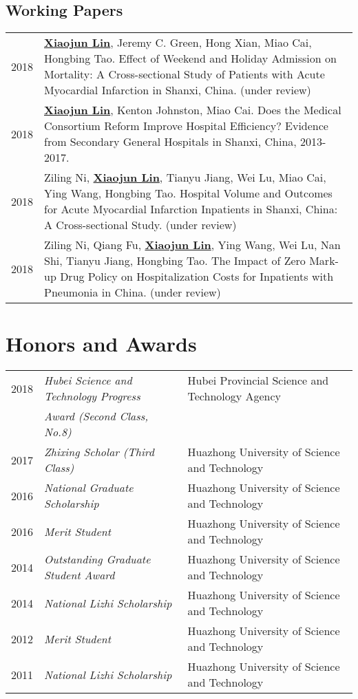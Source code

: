 \documentclass[a4paper,10pt]{article}
\begin{document}
\subsection*{Working Papers}
\begin{longtable}{r p{13cm}}
2018 & \underline{\textbf{Xiaojun Lin}}, Jeremy C. Green, Hong Xian, Miao Cai, Hongbing Tao. Effect of Weekend and Holiday Admission on Mortality: A Cross-sectional Study of Patients with Acute Myocardial Infarction in Shanxi, China. (under review)\\[5pt]

2018 & \underline{\textbf{Xiaojun Lin}}, Kenton Johnston, Miao Cai. Does the Medical Consortium Reform Improve Hospital Efficiency? Evidence from Secondary General Hospitals in Shanxi, China, 2013-2017.\\[5pt]

2018 & Ziling Ni, \underline{\textbf{Xiaojun Lin}}, Tianyu Jiang, Wei Lu, Miao Cai, Ying Wang, Hongbing Tao. Hospital Volume and Outcomes for Acute Myocardial Infarction Inpatients in Shanxi, China: A Cross-sectional Study. (under review)\\[5pt]

2018 & Ziling Ni, Qiang Fu, \underline{\textbf{Xiaojun Lin}}, Ying Wang, Wei Lu, Nan Shi, Tianyu Jiang, Hongbing Tao. The Impact of Zero Mark-up Drug Policy on Hospitalization Costs for Inpatients with Pneumonia in China. (under review)\\[5pt]
\end{longtable}


\section{Honors and Awards}
\begin{tabular}{rll}
2018 &  \textit{Hubei Science and Technology Progress} & Hubei Provincial Science and Technology Agency\\
& \textit{Award (Second Class, No.8)} & \\
2017 & \textit{Zhixing Scholar (Third Class)} & Huazhong University of Science and Technology\\
2016 & \textit{National Graduate Scholarship} & Huazhong University of Science and Technology\\
2016 & \textit{Merit Student} &  Huazhong University of Science and Technology\\
2014 & 	\textit{Outstanding Graduate Student Award} & Huazhong University of Science and Technology\\
2014 & 	\textit{National Lizhi Scholarship} &  Huazhong University of Science and Technology\\
2012 & 	\textit{Merit Student} & Huazhong University of Science and Technology\\
2011 & 	\textit{National Lizhi Scholarship} & Huazhong University of Science and Technology
\end{tabular}
\end{document}
